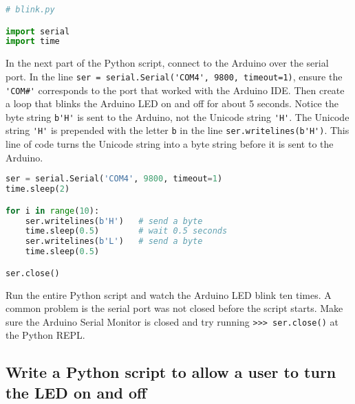 \documentclass{book}
\newcommand{\passthrough}[1]{#1}
\begin{document}
    
        \begin{lstlisting}[language=Python]
# blink.py

import serial
import time
\end{lstlisting}
    




    
        In the next part of the Python script, connect to the Arduino over the
serial port. In the line
\passthrough{\lstinline!ser = serial.Serial('COM4', 9800, timeout=1)!},
ensure the \passthrough{\lstinline!'COM#'!} corresponds to the port that
worked with the Arduino IDE. Then create a loop that blinks the Arduino
LED on and off for about 5 seconds. Notice the byte string
\passthrough{\lstinline!b'H'!} is sent to the Arduino, not the Unicode
string \passthrough{\lstinline!'H'!}. The Unicode string
\passthrough{\lstinline!'H'!} is prepended with the letter
\passthrough{\lstinline!b!} in the line
\passthrough{\lstinline!ser.writelines(b'H')!}. This line of code turns
the Unicode string into a byte string before it is sent to the Arduino.
    




    
        \begin{lstlisting}[language=Python]
ser = serial.Serial('COM4', 9800, timeout=1)
time.sleep(2)

for i in range(10):
    ser.writelines(b'H')   # send a byte
    time.sleep(0.5)        # wait 0.5 seconds
    ser.writelines(b'L')   # send a byte
    time.sleep(0.5)

ser.close()
\end{lstlisting}
    




    
        Run the entire Python script and watch the Arduino LED blink ten times.
A common problem is the serial port was not closed before the script
starts. Make sure the Arduino Serial Monitor is closed and try running
\passthrough{\lstinline!>>> ser.close()!} at the Python REPL.
    




    
        \hypertarget{write-a-python-script-to-allow-a-user-to-turn-the-led-on-and-off}{%
\subsection{Write a Python script to allow a user to turn the LED on and
off}\label{write-a-python-script-to-allow-a-user-to-turn-the-led-on-and-off}}
    
\end{document}
